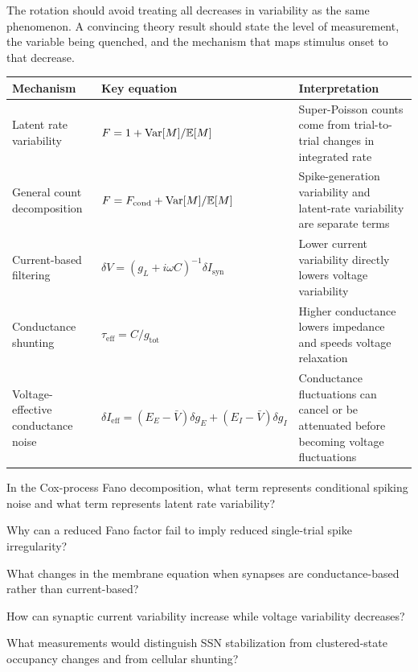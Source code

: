 The rotation should avoid treating all decreases in variability as the same phenomenon. A convincing theory result should state the level of measurement, the variable being quenched, and the mechanism that maps stimulus onset to that decrease.

\begin{chaptersummary}
\begin{center}
\renewcommand{\arraystretch}{1.5}
\begin{tabularx}{\textwidth}{@{}l X X@{}}
  \toprule
  \textbf{Mechanism} & \textbf{Key equation} & \textbf{Interpretation} \\
  \midrule
  Latent rate variability &
  $F=1+\operatorname{Var}[M]/\mathbb{E}[M]$ &
  Super-Poisson counts come from trial-to-trial changes in integrated rate \\
  General count decomposition &
  $F=F_{\mathrm{cond}}+\operatorname{Var}[M]/\mathbb{E}[M]$ &
  Spike-generation variability and latent-rate variability are separate terms \\
  Current-based filtering &
  $\delta V=(g_L+i\omega C)^{-1}\delta I_{\mathrm{syn}}$ &
  Lower current variability directly lowers voltage variability \\
  Conductance shunting &
  $\tau_{\mathrm{eff}}=C/g_{\mathrm{tot}}$ &
  Higher conductance lowers impedance and speeds voltage relaxation \\
  Voltage-effective conductance noise &
  $\delta I_{\mathrm{eff}}=(E_E-\bar V)\delta g_E+(E_I-\bar V)\delta g_I$ &
  Conductance fluctuations can cancel or be attenuated before becoming voltage fluctuations \\
  \bottomrule
\end{tabularx}
\end{center}
\end{chaptersummary}

\begin{conceptquestions}
  \item In the Cox-process Fano decomposition, what term represents conditional spiking noise and what term represents latent rate variability?
  \item Why can a reduced Fano factor fail to imply reduced single-trial spike irregularity?
  \item What changes in the membrane equation when synapses are conductance-based rather than current-based?
  \item How can synaptic current variability increase while voltage variability decreases?
  \item What measurements would distinguish SSN stabilization from clustered-state occupancy changes and from cellular shunting?
\end{conceptquestions}
